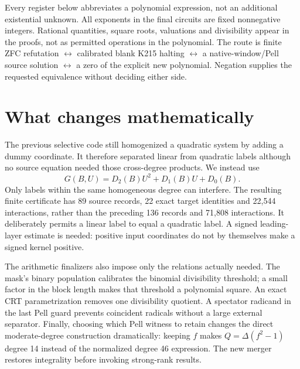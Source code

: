 \documentclass[11pt]{article}
\begin{document}
Every register below abbreviates a polynomial expression, not an additional
existential unknown. All exponents in the final circuits are fixed
nonnegative integers. Rational quantities, square roots, valuations and
divisibility appear in the proofs, not as permitted operations in the
polynomial. The route is finite ZFC refutation $\leftrightarrow$ calibrated
blank K215 halting $\leftrightarrow$ a native-window/Pell source solution
$\leftrightarrow$ a zero of the explicit new polynomial. Negation supplies
the requested equivalence without deciding either side.



\section{What changes mathematically}
The previous selective code still homogenized a quadratic system by adding
a dummy coordinate. It therefore separated linear from quadratic labels
although no source equation needed those cross-degree products. We instead
use
\[
 G(B,U)=D_2(B)U^2+D_1(B)U+D_0(B).
\]
Only labels within the same homogeneous degree can interfere. The resulting
finite certificate has 89 source records, 22 exact target identities and
22,544 interactions, rather than the preceding 136 records and 71,808
interactions. It deliberately permits a linear label to equal a quadratic
label. A signed leading-layer estimate is needed: positive input coordinates
do not by themselves make a signed kernel positive.

The arithmetic finalizers also impose only the relations actually needed.
The mask's binary population calibrates the binomial divisibility threshold;
a small factor in the block length makes that threshold a polynomial square.
An exact CRT parametrization removes one divisibility quotient. A spectator
radicand in the last Pell guard prevents coincident radicals without a large
external separator. Finally, choosing which Pell witness to retain changes
the direct moderate-degree construction dramatically: keeping $f$ makes
$Q=\Delta(f^2-1)$ degree 14 instead of the normalized degree 46 expression.
The new merger restores integrality before invoking strong-rank results.







\end{document}
